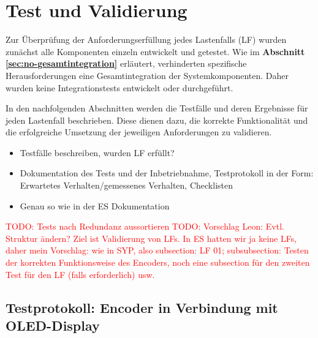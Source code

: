 \newpage
\section{Test und Validierung}
\label{sec:test-validation}
Zur Überprüfung der Anforderungserfüllung jedes Lastenfalls (LF) wurden zunächst alle Komponenten einzeln entwickelt und getestet. Wie im \textbf{Abschnitt \ref{sec:no-gesamtintegration}} erläutert, verhinderten spezifische Herausforderungen eine Gesamtintegration der Systemkomponenten. Daher wurden keine Integrationstests entwickelt oder durchgeführt.

In den nachfolgenden Abschnitten werden die Testfälle und deren Ergebnisse für jeden Lastenfall beschrieben. Diese dienen dazu, die korrekte Funktionalität und die erfolgreiche Umsetzung der jeweiligen Anforderungen zu validieren.


\begin{itemize}
	\item Testfälle beschreiben, wurden LF erfüllt?
	\item Dokumentation des Tests und der Inbetriebnahme, Testprotokoll in der Form: Erwartetes Verhalten/gemessenes Verhalten, Checklisten
	\item Genau so wie in der ES Dokumentation
\end{itemize}

\textcolor{red}{TODO: Tests nach Redundanz aussortieren}
\textcolor{red}{TODO: Vorschlag Leon: Evtl. Struktur ändern? Ziel ist Validierung von LFs. In ES hatten wir ja keine LFs, daher mein Vorschlag: wie in SYP, also subsection: LF 01; subsubsection: Testen der korrekten Funktionsweise des Encoders, noch eine subsection für den zweiten Test für den LF (falls erforderlich) usw.}



\subsection{Testprotokoll: Encoder in Verbindung mit OLED-Display}






